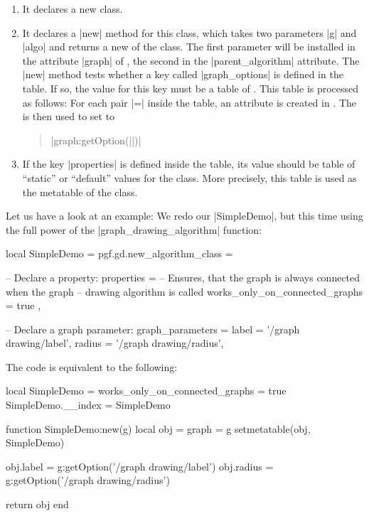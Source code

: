 \begin{enumerate}
\item It declares a new class.
\item It declares a |new| method for this class, which takes two
  parameters |g| and |algo| and returns a new  of the
  class. The first parameter will be installed in the attribute
  |graph| of , the second in the |parent_algorithm|
  attribute. The |new| method tests whether a key called 
  |graph_options| is defined in the  table. If so, the
  value for this key must be a table of . This table is
  processed as follows: For each pair  |=| 
  inside the  table, an attribute  is created
  in . The  is then used to set 
  to 
  \begin{quote}
    |graph:getOption(||)|
  \end{quote}
\item If the key |properties| is defined inside the  table,
  its value should be table of ``static'' or ``default'' values for
  the class. More precisely, this table is used as the metatable of
  the class.
\end{enumerate}

Let us have a look at an example: We redo our |SimpleDemo|, but this
time using the full power of the |graph_drawing_algorithm| function:

\begin{codeexample}
local SimpleDemo = pgf.gd.new_algorithm_class = {
  
  -- Declare a property:
  properties = {
    -- Ensures, that the graph is always connected when the graph
    -- drawing algorithm is called
    works_only_on_connected_graphs = true
  },

  -- Declare a graph parameter:
  graph_parameters = {
    label  = '/graph drawing/label',
    radius = '/graph drawing/radius',
  }
}
\end{codeexample}

The code is equivalent to the following:
\begin{codeexample}
local SimpleDemo = { works_only_on_connected_graphs = true }
SimpleDemo.__index = SimpleDemo

function SimpleDemo:new(g)
  local obj = { graph = g }
  setmetatable(obj, SimpleDemo)
  
  obj.label  = g:getOption('/graph drawing/label')
  obj.radius = g:getOption('/graph drawing/radius')
  
  return obj  
end  
\end{codeexample}



